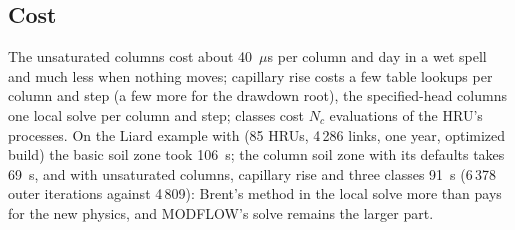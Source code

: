 \subsection{Cost}\label{sec:szcost}
The unsaturated columns cost about 40~$\mu$s per column and day in a wet spell and much less when nothing moves;
capillary rise costs a few table lookups per column and step (a few more for the drawdown root), the specified-head columns one local solve per column and step; classes
cost $N_c$ evaluations of the HRU's processes. On the Liard example with  (85 HRUs, 4\,286 links,
one year, optimized build) the basic soil zone took 106~s; the column soil zone with its defaults takes 69~s, and with unsaturated columns, capillary rise
and three classes 91~s (6\,378 outer iterations against 4\,809): Brent's method in the local solve more than pays for
the new physics, and MODFLOW's solve remains the larger part.

